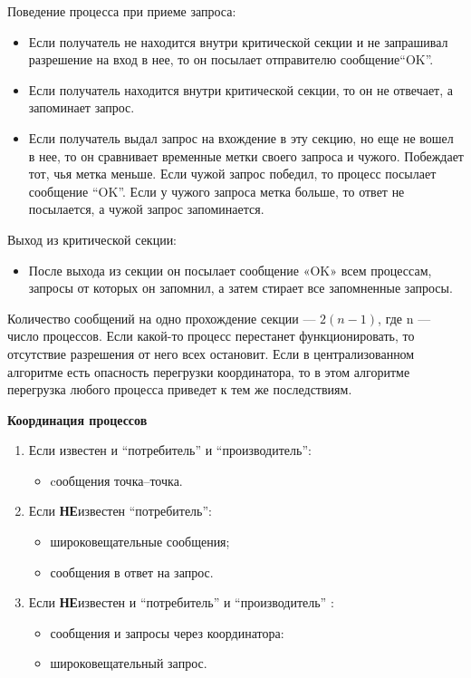 \begin{enumerate}
Поведение процесса при приеме запроса:
\begin{itemize}
\item
Если получатель не находится внутри критической секции и не запрашивал разрешение на вход в нее, то он посылает отправителю сообщение``OK''.
\item
Если получатель находится внутри критической секции, то он не отвечает, а запоминает запрос.
\item
Если получатель выдал запрос на вхождение в эту секцию, но еще не вошел в нее, то он сравнивает временные метки своего запроса и чужого.
Побеждает тот, чья метка меньше. 
Если чужой запрос победил, то процесс посылает сообщение ``OK''. 
Если у чужого запроса метка больше, то ответ не посылается, а чужой запрос запоминается.
\end{itemize}

Выход из критической секции:
\begin{itemize}
\item
После выхода из секции он посылает сообщение «OK» всем процессам, запросы от которых он запомнил, а затем стирает все запомненные запросы.
\end{itemize}

Количество сообщений на одно прохождение секции --- $2(n-1)$, где n --- число процессов.
Если какой-то процесс перестанет функционировать, то отсутствие разрешения от него всех остановит.
Если в централизованном алгоритме есть опасность перегрузки координатора, то в этом алгоритме перегрузка любого процесса приведет к тем же последствиям.



\end{enumerate}

\centerline{\textbf{Координация процессов}}
\begin{enumerate}
\item  Если известен и ``потребитель'' и ``производитель'': 
\begin{itemize} \item cообщения точка--точка. \end{itemize}
\item Если \textbf{НЕ}известен ``потребитель'':
\begin{itemize}
    \item широковещательные сообщения;
    \item сообщения в ответ на запрос.
\end{itemize}
\item Если \textbf{НЕ}известен и ``потребитель'' и ``производитель'' :
\begin{itemize}
    \item сообщения и запросы через координатора:
    \item широковещательный запрос.
\end{itemize}
\end{enumerate}

